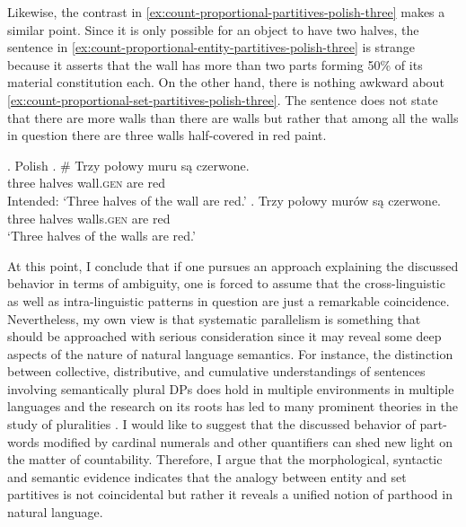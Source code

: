 Likewise, the contrast in \ref{ex:count-proportional-partitives-polish-three} makes a similar point. Since it is only possible for an object to have two halves, the sentence in \ref{ex:count-proportional-entity-partitives-polish-three} is strange because it asserts that the wall has more than two parts forming 50\% of its material constitution each. On the other hand, there is nothing awkward about \ref{ex:count-proportional-set-partitives-polish-three}. The sentence does not state that there are more walls than there are walls but rather that among all the walls in question there are three walls half-covered in red paint.

\ex.\label{ex:count-proportional-partitives-polish-three} Polish
\ag. \# Trzy połowy muru są czerwone.\label{ex:count-proportional-entity-partitives-polish-three}\\
three halves wall\textsc{.gen} are red\\
Intended: `Three halves of the wall are red.'
\bg. Trzy połowy murów są czerwone.\label{ex:count-proportional-set-partitives-polish-three}\\
three halves walls\textsc{.gen} are red\\
`Three halves of the walls are red.'

At this point, I conclude that if one pursues an approach explaining the discussed behavior in terms of ambiguity, one is forced to assume that the cross-linguistic as well as intra-linguistic patterns in question are just a remarkable coincidence. Nevertheless, my own view is that systematic parallelism is something that should be approached with serious consideration since it may reveal some deep aspects of the nature of natural language semantics. For instance, the distinction between collective, distributive, and cumulative understandings of sentences involving semantically plural DPs does hold in multiple environments in multiple languages and the research on its roots has led to many prominent theories in the study of pluralities \citep[e.g.,][]{scha1981distributive,link1983logical,link1984hydras,hoeksema1983plurality,gillon1987readings,landman1989groupsi,landman1989groupsii,landman2000events,schwarzschild1991meaning,schwarzschild1996pluralities,schein1993plurals,lasersohn1995plurality,beck_sauerland2000cumulation,winter2001flexibility,champollion2010parts,champollion2017parts,dotlacil2010anaphora,schmitt2013more,zweig2008dependent}. I would like to suggest that the discussed behavior of part-words modified by cardinal numerals and other quantifiers can shed new light on the matter of countability. Therefore, I argue that the morphological, syntactic and semantic evidence indicates that the analogy between entity and set partitives is not coincidental but rather it reveals a unified notion of parthood in natural language. 

